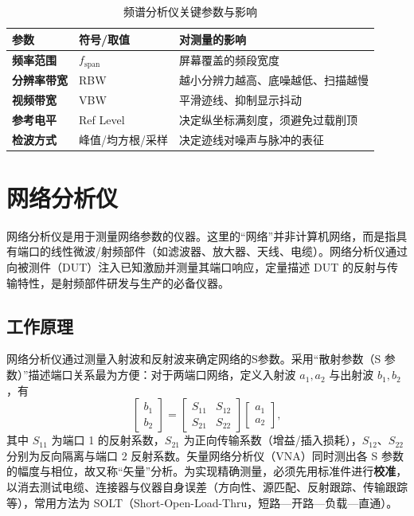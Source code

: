 \begin{table}[htbp]
    \centering
    \caption{频谱分析仪关键参数与影响}
    \begin{tabular}{|p{3.2cm}|p{4.4cm}|p{6.4cm}|}
        \hline
        \textbf{参数} & \textbf{符号/取值} & \textbf{对测量的影响} \\
        \hline
        \textbf{频率范围} & $f_{\mathrm{span}}$ & 屏幕覆盖的频段宽度 \\
        \hline
        \textbf{分辨率带宽} & RBW & 越小分辨力越高、底噪越低、扫描越慢 \\
        \hline
        \textbf{视频带宽} & VBW & 平滑迹线、抑制显示抖动 \\
        \hline
        \textbf{参考电平} & Ref Level & 决定纵坐标满刻度，须避免过载削顶 \\
        \hline
        \textbf{检波方式} & 峰值/均方根/采样 & 决定迹线对噪声与脉冲的表征 \\
        \hline
    \end{tabular}
\end{table}

\section{网络分析仪}
\label{sec:network_analyzer}

网络分析仪是用于测量网络参数的仪器。这里的“网络”并非计算机网络，而是指具有端口的线性微波/射频部件（如滤波器、放大器、天线、电缆）。网络分析仪通过向被测件（DUT）注入已知激励并测量其端口响应，定量描述 DUT 的反射与传输特性，是射频部件研发与生产的必备仪器。

\subsection{工作原理}

网络分析仪通过测量入射波和反射波来确定网络的S参数。采用“散射参数（S 参数）”描述端口关系最为方便：对于两端口网络，定义入射波 $a_1,a_2$ 与出射波 $b_1,b_2$，有
\[
    \begin{bmatrix} b_1 \\ b_2 \end{bmatrix}
    =
    \begin{bmatrix} S_{11} & S_{12} \\ S_{21} & S_{22} \end{bmatrix}
    \begin{bmatrix} a_1 \\ a_2 \end{bmatrix} ,
\]
其中 $S_{11}$ 为端口 1 的反射系数，$S_{21}$ 为正向传输系数（增益/插入损耗），$S_{12}$、$S_{22}$ 分别为反向隔离与端口 2 反射系数。矢量网络分析仪（VNA）同时测出各 S 参数的幅度与相位，故又称“矢量”分析。为实现精确测量，必须先用标准件进行\textbf{校准}，以消去测试电缆、连接器与仪器自身误差（方向性、源匹配、反射跟踪、传输跟踪等），常用方法为 SOLT（Short-Open-Load-Thru，短路—开路—负载—直通）。

